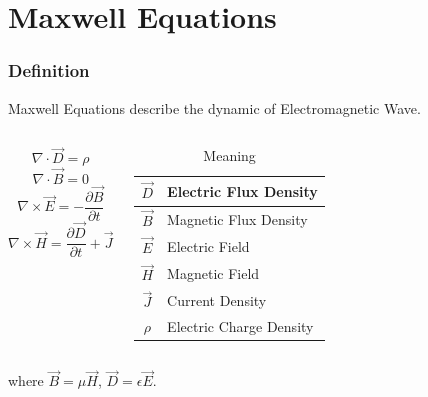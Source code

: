 \documentclass{beamer}
\begin{document}
\section{Maxwell Equations}

\begin{frame}
    \frametitle{Definition}
    Maxwell Equations describe the dynamic of Electromagnetic Wave.
    \begin{columns}

        \begin{equation}
            \nabla \cdot \vec{D} = \rho
        \end{equation}
        \begin{equation}
            \nabla \cdot \vec{B} = 0
        \end{equation}
        \begin{equation}
            \nabla \times \vec{E} = - \frac{\partial{\vec{B}}}{\partial{t}}
        \end{equation}
        \begin{equation}
            \nabla \times \vec{H} = \frac{\partial{\vec{D}}}{\partial{t}} + \vec{J}
        \end{equation}

        \begin{table}[h]
            \centering
            \caption{Meaning}
            \begin{tabular}{|c|l|}
                \hline
                $\vec{D}$ & Electric Flux Density   \\\hline
                $\vec{B}$ & Magnetic Flux Density   \\\hline
                $\vec{E}$ & Electric Field          \\\hline
                $\vec{H}$ & Magnetic Field          \\\hline
                $\vec{J}$ & Current Density         \\\hline
                $\rho$    & Electric Charge Density \\
                \hline
            \end{tabular}
        \end{table}

    \end{columns}

    \vspace{5mm}
    where $\vec{B} = \mu \vec{H}$, $\vec{D} = \epsilon \vec{E}$.
\end{frame}
\end{document}
